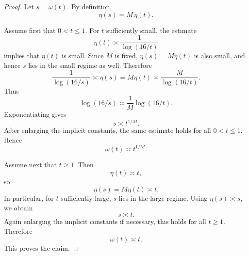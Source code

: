 \documentclass[12pt]{amsart}
\numberwithin{equation}{section}
\numberwithin{figure}{section}
\theoremstyle{definition}
\theoremstyle{plain}
\begin{document}
\begin{proof}
Let $s=\omega(t)$. By definition,
\[
\eta(s)=M\,\eta(t).
\]

Assume first that $0<t\le 1$. For $t$ sufficiently small, the estimate
\[
\eta(t)\asymp \frac{1}{\log(16/t)}
\]
implies that $\eta(t)$ is small. Since $M$ is fixed, $\eta(s)=M\eta(t)$
is also small, and hence $s$ lies in the small regime as well. Therefore
\[
\frac{1}{\log(16/s)}
\asymp \eta(s)
=M\eta(t)
\asymp \frac{M}{\log(16/t)}.
\]
Thus
\[
\log(16/s)\asymp \frac{1}{M}\log(16/t).
\]
Exponentiating gives
\[
s\asymp t^{1/M}.
\]
After enlarging the implicit constants, the same estimate holds for all
$0<t\le1$. Hence
\[
\omega(t)\asymp t^{1/M}.
\]

Assume next that $t\ge 1$. Then
\[
\eta(t)\asymp t,
\]
so
\[
\eta(s)=M\eta(t)\asymp t.
\]
In particular, for $t$ sufficiently large, $s$ lies in the large regime.
Using $\eta(s)\asymp s$, we obtain
\[
s\asymp t.
\]
Again enlarging the implicit constants if necessary, this holds for all
$t\ge1$. Therefore
\[
\omega(t)\asymp t.
\]
This proves the claim.
\end{proof}


  
    
	
\end{document}
